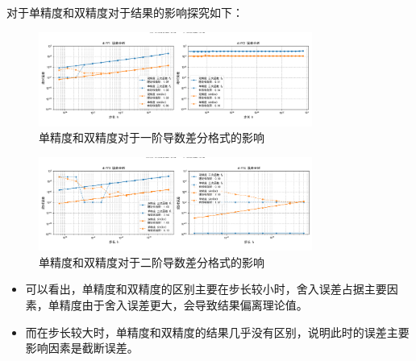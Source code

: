\documentclass[UTF8]{ctexart}
\begin{document}
对于单精度和双精度对于结果的影响探究如下：
\begin{figure}[H]
    \centering
    \includegraphics[width=0.8\textwidth]{Figure_3.png} 
    \caption{单精度和双精度对于一阶导数差分格式的影响}
\end{figure}
\begin{figure}[H]
    \centering
    \includegraphics[width=0.8\textwidth]{Figure_4.png} 
    \caption{单精度和双精度对于二阶导数差分格式的影响}
\end{figure}

\begin{itemize}
    \item 可以看出，单精度和双精度的区别主要在步长较小时，舍入误差占据主要因素，单精度由于舍入误差更大，会导致结果偏离理论值。
    \item 而在步长较大时，单精度和双精度的结果几乎没有区别，说明此时的误差主要影响因素是截断误差。
\end{itemize}
\end{document}
